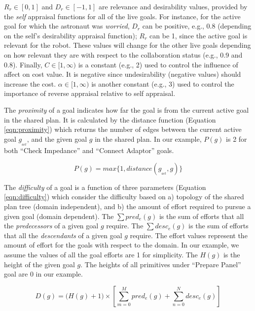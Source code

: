 $R_r\in[0,1]$ and $D_r\in[-1,1]$ are relevance and desirability values, provided
by the \textit{self} appraisal functions for all of the live goals. For
instance, for the active goal for which the astronaut was \textit{worried},
$D_r$ can be positive, e.g., 0.8 (depending on the self's desirability appraisal
function); $R_r$ can be 1, since the active goal is relevant for the robot.
These values will change for the other live goals depending on how
relevant they are with respect to the collaboration status (e.g., 0.9 and 0.8).
Finally, $C\in[1,\infty)$ is a constant (e.g., 2) used to control the influence
of affect on cost value. It is negative since undesirability (negative values)
should increase the cost. $\alpha\in[1,\infty)$ is another constant (e.g., 3)
used to control the importance of reverse appraisal relative to self appraisal.

The \textit{proximity} of a goal indicates how far the goal is from the current
active goal in the shared plan. It is calculated by the distance function
(Equation \ref{eqn:proximity}) which returns the number of edges between the
current active goal $g_{_{act}}$, and the given goal $g$ in the shared plan. In
our example, $P(g)$ is 2 for both ``Check Impedance'' and ``Connect Adaptor''
goals.

\begin{equation}
P(g) = max\big\{1, distance(g_{_{act}},g)\big\}
\label{eqn:proximity}
\end{equation}

The \textit{difficulty} of a goal is a function of three parameters (Equation
\ref{eqn:difficulty}) which consider the difficulty based on a) topology of the
shared plan tree (domain independent), and b) the amount of effort required to
pursue a given goal (domain dependent). The $\sum pred_e(g)$ is the sum of
efforts that all the \textit{predecessors} of a given goal $g$ require. The
$\sum desc_e(g)$ is the sum of efforts that all the \textit{descendants} of a
given goal $g$ require. The effort values represent the amount of effort for the
goals with respect to the domain. In our example, we assume the values of all
the goal efforts are 1 for simplicity. The $H(g)$ is the height of the given
goal $g$. The heights of all primitives under ``Prepare Panel'' goal are 0 in
our example.

\begin{equation}
D(g) = \Big(H(g)+1\Big)\times\left[\sum\limits_{m=0}^{M} pred_e(g) +
\sum\limits_{n=0}^{N} desc_e(g)\right]
\label{eqn:difficulty}
\end{equation}

